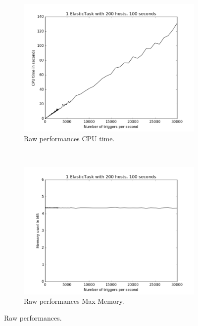 \documentclass[a4paper, onecolumn, 11pt]{article}
\begin{document}
    \begin{figure}
    	\centering
    	\hspace*{-4em}
    	\begin{subfigure}[t]{0.6\textwidth}
    		\includegraphics[width=\textwidth]{../plots/raw_perf_oneet_time}
    		\caption{Raw performances CPU time.}
    		\label{time_oneet_raw}
    	\end{subfigure}%
    	~
    	\begin{subfigure}[t]{0.6\textwidth}
    		\includegraphics[width=\textwidth]{../plots/raw_perf_oneet_mem}
    		\caption{Raw performances Max Memory.}
    		\label{mem_oneet_raw}
    	\end{subfigure}%
    	\caption{Raw performances.}
    \end{figure}
        
\end{document}
